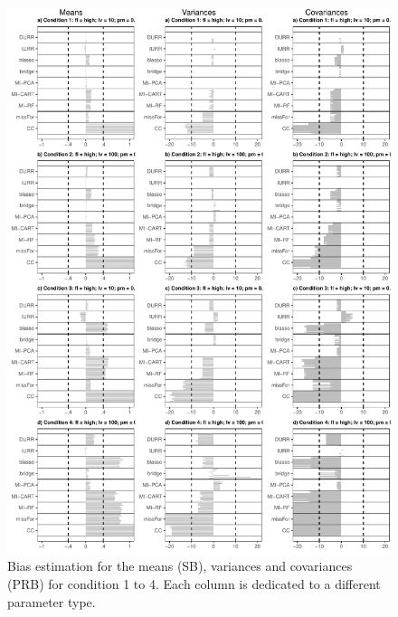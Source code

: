 \begin{figure}
	\includegraphics[width=\textwidth]{../../output/graphs/exp2_semR_bias_14.pdf}
\caption{Bias estimation for the means (SB), variances and covariances (PRB) for condition 1 to 4.
	Each column is dedicated to a different parameter type.}
\label{fig:exp2bias}
\end{figure}


